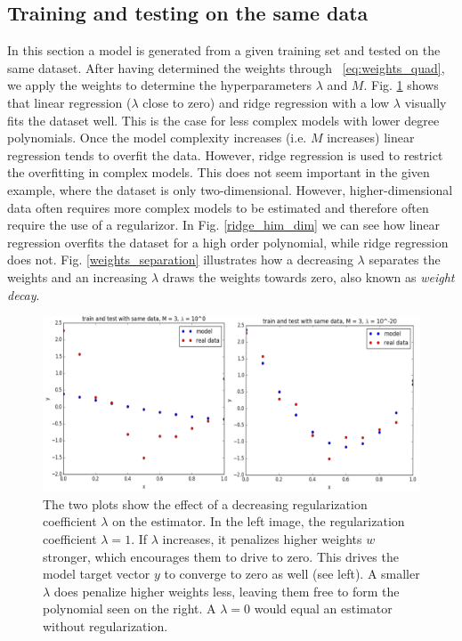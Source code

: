\subsection{Training and testing on the same data}
In this section a model is generated from a given training set and tested on the same dataset. After having determined the weights through ~\cref{eq:weights_quad}, we apply the weights to determine the hyperparameters $\lambda$ and $M$. Fig. \ref{varying_lambda} shows that linear regression ($\lambda$ close to zero) and ridge regression with a low $\lambda$ visually fits the dataset well. This is the case for less complex models with lower degree polynomials. Once the model complexity increases (i.e. $M$ increases) linear regression tends to overfit the data. However, ridge regression is used to restrict the overfitting in complex models. 
This does not seem important in the given example, where the dataset is only two-dimensional. However, higher-dimensional data often requires more complex models to be estimated and therefore often require the use of a regularizor. In Fig. \ref{ridge_him_dim} we can see how linear regression overfits the dataset for a high order polynomial, while ridge regression does not. Fig. \ref{weights_separation} illustrates how a decreasing $\lambda$ separates the weights and an increasing $\lambda$ draws the weights towards zero, also known as \textit{weight decay}.  

\begin{figure}[!ht]
   \centering
   \includegraphics[width=0.9\linewidth]{figures/varying_lambda}
   \caption{The two plots show the effect of a decreasing regularization coefficient $\lambda$ on the estimator. In the left image, the regularization coefficient $\lambda = 1$. If $\lambda$ increases, it penalizes higher weights $w$ stronger, which encourages them to drive to zero. This drives the model target vector $y$ to converge to zero as well (see left). A smaller $\lambda$ does penalize higher weights less, leaving them free to form the polynomial seen on the right. A $\lambda = 0$ would equal an estimator without regularization.}
\label{varying_lambda}
\end{figure}

